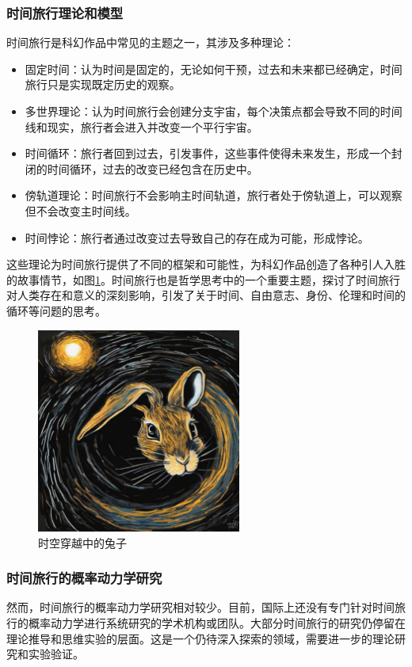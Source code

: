 \subsubsection{时间旅行理论和模型}
时间旅行是科幻作品中常见的主题之一，其涉及多种理论：
\begin{itemize}
  \item 固定时间：认为时间是固定的，无论如何干预，过去和未来都已经确定，时间旅行只是实现既定历史的观察。
  \item 多世界理论：认为时间旅行会创建分支宇宙，每个决策点都会导致不同的时间线和现实，旅行者会进入并改变一个平行宇宙。
  \item 时间循环：旅行者回到过去，引发事件，这些事件使得未来发生，形成一个封闭的时间循环，过去的改变已经包含在历史中。
  \item 傍轨道理论：时间旅行不会影响主时间轨道，旅行者处于傍轨道上，可以观察但不会改变主时间线。
  \item 时间悖论：旅行者通过改变过去导致自己的存在成为可能，形成悖论。
\end{itemize}
这些理论为时间旅行提供了不同的框架和可能性，为科幻作品创造了各种引人入胜的故事情节，如图\ref{fig:rabbit}。时间旅行也是哲学思考中的一个重要主题，探讨了时间旅行对人类存在和意义的深刻影响，引发了关于时间、自由意志、身份、伦理和时间的循环等问题的思考。
\begin{figure}[htb]
  \centering
  \includegraphics[width=0.6\textwidth]{fig/ch1/rabbit.png}
  \caption{时空穿越中的兔子}
  \label{fig:rabbit}
\end{figure}

\subsubsection{时间旅行的概率动力学研究}
然而，时间旅行的概率动力学研究相对较少。目前，国际上还没有专门针对时间旅行的概率动力学进行系统研究的学术机构或团队。大部分时间旅行的研究仍停留在理论推导和思维实验的层面。这是一个仍待深入探索的领域，需要进一步的理论研究和实验验证。

